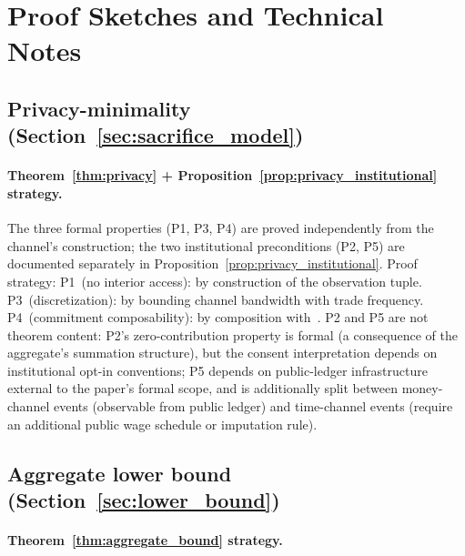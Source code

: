 \section{Proof Sketches and Technical Notes}
\label{app:proofs}

\subsection{Privacy-minimality
(Section~\ref{sec:sacrifice_model})}

\paragraph{Theorem~\ref{thm:privacy} + Proposition~\ref{prop:privacy_institutional}
strategy.}
The three formal properties (P1, P3, P4) are proved
independently from the channel's construction; the two
institutional preconditions (P2, P5) are documented separately
in Proposition~\ref{prop:privacy_institutional}.  Proof
strategy:
P1~(no interior access): by construction of the observation
tuple.
P3~(discretization): by bounding channel bandwidth with trade
frequency.
P4~(commitment composability): by composition
with~\citep[Definition~6]{lasser2026exo}.
P2 and P5 are not theorem content: P2's zero-contribution
property is formal (a consequence of the aggregate's summation
structure), but the consent interpretation depends on
institutional opt-in conventions; P5 depends on public-ledger
infrastructure external to the paper's formal scope, and is
additionally split between money-channel events (observable
from public ledger) and time-channel events (require an
additional public wage schedule or imputation rule).

\subsection{Aggregate lower bound
(Section~\ref{sec:lower_bound})}

\paragraph{Theorem~\ref{thm:aggregate_bound} strategy.}


